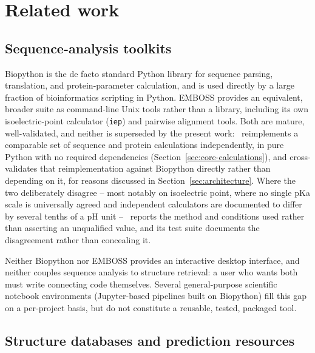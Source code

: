 \section{Related work}
\label{sec:related-work}

\subsection{Sequence-analysis toolkits}

Biopython \citep{cock2009biopython} is the de facto standard Python library
for sequence parsing, translation, and protein-parameter calculation, and is
used directly by a large fraction of bioinformatics scripting in Python.
EMBOSS \citep{rice2000emboss} provides an equivalent, broader suite as
command-line Unix tools rather than a library, including its own
isoelectric-point calculator (\texttt{iep}) and pairwise alignment tools. Both
are mature, well-validated, and neither is superseded by the present work:
\bsi\ reimplements a comparable set of sequence and protein calculations
independently, in pure Python with no required dependencies
(Section~\ref{sec:core-calculations}), and cross-validates that
reimplementation against Biopython directly rather than depending on it, for
reasons discussed in Section~\ref{sec:architecture}. Where the two
deliberately disagree -- most notably on isoelectric point, where no single
pKa scale is universally agreed and independent calculators are documented
to differ by several tenths of a pH unit \citep{kozlowski2016ipc} -- \bsi\
reports the method and conditions used rather than asserting an
unqualified value, and its test suite documents the disagreement rather than
concealing it.

Neither Biopython nor EMBOSS provides an interactive desktop interface, and
neither couples sequence analysis to structure retrieval: a user who wants
both must write connecting code themselves. Several general-purpose
scientific notebook environments (Jupyter-based pipelines built on Biopython)
fill this gap on a per-project basis, but do not constitute a reusable,
tested, packaged tool.

\subsection{Structure databases and prediction resources}


